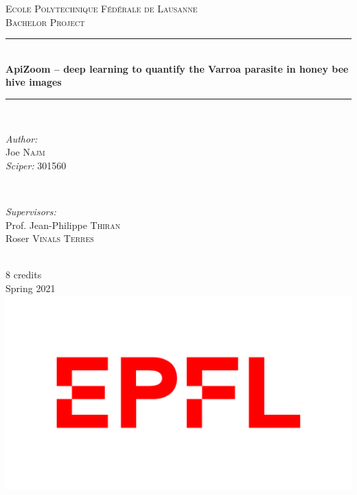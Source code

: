 \documentclass{article}
\begin{document}
\begin{titlepage}

\newcommand{\HRule}{\rule{\linewidth}{1mm}} 
\center 

\textsc{\LARGE Ecole Polytechnique Fédérale de Lausanne}\\[1.5cm]
\textsc{\Large Bachelor Project}\\[0.5cm]  

\HRule \\[0.4cm]
{ \huge \bfseries ApiZoom – deep learning to quantify the Varroa parasite in honey bee hive images}\\[0.4cm] 
\HRule \\[1.5cm]


\begin{minipage}{0.4\textwidth}
\begin{flushleft} \large
\emph{Author:}\\
Joe \textsc{Najm}\\
\emph{Sciper:} 301560
\end{flushleft}
\end{minipage}
~
\begin{minipage}{0.4\textwidth}
\begin{flushright} \large
\emph{Supervisors:} \\
Prof. Jean-Philippe \textsc{Thiran} \\
Roser \textsc{Vinals Terres} \\
\end{flushright}
\end{minipage}\\[1cm]


{\large 8 credits}\\
{\large Spring 2021}\\[1cm] 

\includegraphics[scale = 0.4]{epfl.png}\\[1cm]

\vfill

\end{titlepage}
\end{document}
